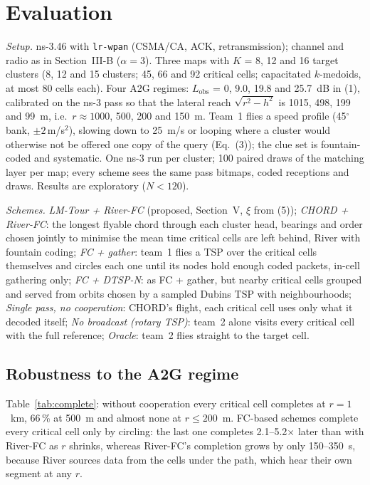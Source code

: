 \section{Evaluation}
\emph{Setup.} ns-3.46 with \texttt{lr-wpan} (CSMA/CA, ACK, retransmission); channel and radio as in Section~III-B
($\alpha = 3$). Three maps with $K$ = 8, 12 and 16 target clusters (8, 12 and 15 clusters; 45, 66 and 92 critical
cells; capacitated $k$-medoids, at most 80 cells each). Four A2G regimes: $L_{\mathrm{obs}}$ = 0, 9.0, 19.8 and
25.7~dB in (1), calibrated on the ns-3 pass so that the lateral reach $\sqrt{r^2-h^2}$ is 1015, 498, 199 and 99~m,
i.e.\ $r \approx 1000$, 500, 200 and 150~m. Team~1 flies a speed profile (45$^\circ$ bank, $\pm2$\,m/s$^2$), slowing
down to 25~m/s or looping where a cluster would otherwise not be offered one copy of the query (Eq.~(3)); the clue set
is fountain-coded and systematic. One ns-3 run per cluster; 100 paired draws of the matching layer per map; every
scheme sees the same pass bitmaps, coded receptions and draws. Results are exploratory ($N < 120$).

\emph{Schemes.} \emph{LM-Tour + River-FC} (proposed, Section~V, $\xi$ from (5)); \emph{CHORD + River-FC}: the longest
flyable chord through each cluster head, bearings and order chosen jointly to minimise the mean time critical cells
are left behind, River with fountain coding; \emph{FC + gather}: team~1 flies a TSP over the critical cells
themselves and circles each one until its nodes hold enough coded packets, in-cell gathering only;
\emph{FC + DTSP-N}: as FC + gather, but nearby critical cells grouped and served from orbits chosen by a sampled
Dubins TSP with neighbourhoods; \emph{Single pass, no cooperation}: CHORD's flight, each critical cell uses only what
it decoded itself; \emph{No broadcast (rotary TSP)}: team~2 alone visits every critical cell with the full
reference; \emph{Oracle}: team~2 flies straight to the target cell.



\subsection{Robustness to the A2G regime}
Table~\ref{tab:complete}: without cooperation every critical cell completes at $r = 1$~km, 66\,\% at 500~m and
almost none at $r \le 200$~m. FC-based schemes complete every critical cell only by circling: the last one completes
2.1--5.2$\times$ later than with River-FC as $r$ shrinks, whereas River-FC's completion grows by only 150--350~s,
because River sources data from the cells under the path, which hear their own segment at any $r$.

